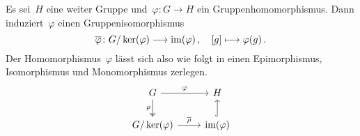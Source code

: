 \begin{corollary}
  Es sei~$H$ eine weiter Gruppe und~$\varphi \colon G \to H$ ein Gruppenhomomorphismus.
  Dann induziert~$\varphi$ einen Gruppenisomorphismus
  \[
    \induced{\varphi}
    \colon
    G/\ker(\varphi) \to \im(\varphi) \,,
    \quad
    \class{g}
    \mapsto
    \varphi(g) \,.
  \]
  Der Homomorphismus~$\varphi$ lässt sich also wie folgt in einen Epimorphismus, Isomorphismus und Monomorphismus zerlegen.
  \[
    \begin{tikzcd}
      G
      \arrow{r}[above]{\varphi}
      \arrow[two heads]{d}[left]{\rho}
      &
      H
      \\
      G/\ker(\varphi)
      \arrow{r}[above]{\induced{\rho}}
      &
      \im(\varphi)
      \arrow[hook]{u}
    \end{tikzcd}
  \]
\end{corollary}

